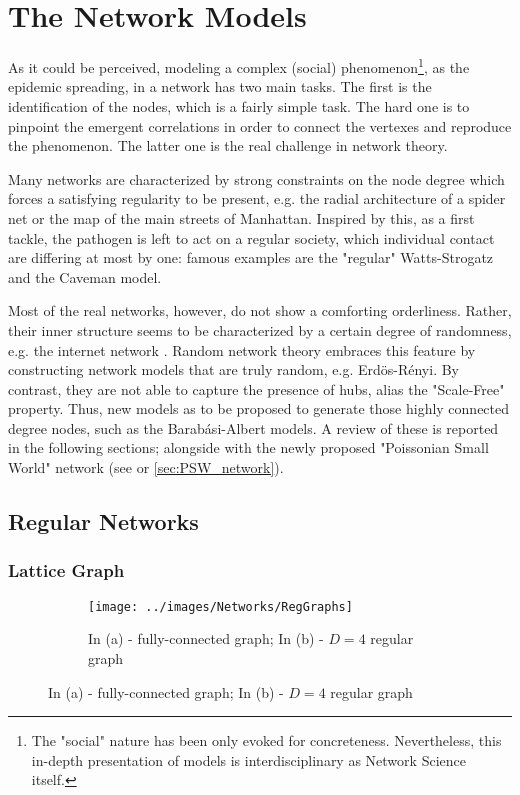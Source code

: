 \documentclass[a4paper,10pt,twoside]{book} %
\theoremstyle{definition}
\begin{document}
\chapter{The Network Models}
\label{ch:network-models}
As it could be perceived, modeling a complex (social) phenomenon\footnote{The "social" nature has been only evoked for concreteness. Nevertheless, this in-depth presentation of models is interdisciplinary as Network Science itself.}, as the epidemic spreading, in a network has two main tasks. The first is the identification of the nodes, which is a fairly simple task. The hard one is to pinpoint the emergent correlations in order to connect the vertexes and reproduce the phenomenon. The latter one is the real challenge in network theory.

Many networks are characterized by strong constraints on the node degree which forces a satisfying regularity to be present, e.g. the radial architecture of a spider net or the map of the main streets of Manhattan.
Inspired by this, as a first tackle, the pathogen is left to act on a regular society, which individual contact are differing at most by one: famous examples are the "regular" Watts-Strogatz and the Caveman model.

Most of the real networks, however, do not show a comforting orderliness. 
Rather, their inner structure seems to be characterized by a certain degree of randomness, e.g. the internet network \cite{barabasi::2016networkbook}. Random network theory embraces this feature by constructing network models that are truly random, e.g. Erdös-Rényi. By contrast, they are not able to capture the presence of hubs, alias the "Scale-Free" property. Thus, new models as to be proposed to generate those highly connected degree nodes, such as the Barabási-Albert models.
A review of these is reported in the following sections; alongside with the newly proposed "Poissonian Small World" network (see \cite{Thurner::NetBasedExpl} or \autoref{sec:PSW_network}).

\section{Regular Networks}
\label{sec:RLN-Caveman_Description}
\subsection{Lattice Graph}
\begin{figure}[ht]
    \begin{subfigure}{\textwidth}
        \texttt{[image: ../images/Networks/RegGraphs]}
        \centering
        \caption{In (a) - fully-connected graph; In (b) - $D = 4$ regular graph \cite{Zelazo:2011_RSensNet_images}}
        \label{fig:RegGraph}
    \end{subfigure}
\end{figure}
\end{document}
